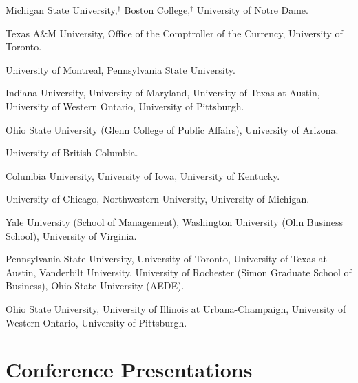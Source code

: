 \documentclass[10pt,letterpaper]{article}
\newcommand{\fncovid}{{\footnotesize ${}^{\dagger}$}}
\begin{document}
\begin{description}[font=\mdseries]
\item[2020]
  Michigan State University,\fncovid
  Boston College,\fncovid
  University of Notre Dame.
\item[2019]
  Texas A\&M University,
  Office of the Comptroller of the Currency,
  University of Toronto.
\item[2018]
  University of Montreal,
  Pennsylvania State University.
\item[2017]
  Indiana University,
  University of Maryland,
  University of Texas at Austin,
  University of Western Ontario,
  University of Pittsburgh.
\item[2016]
  Ohio State University (Glenn College of Public Affairs),
  University of Arizona.
\item[2015]
  University of British Columbia.
\item[2014]
  Columbia University,
  University of Iowa,
  University of Kentucky.
\item[2013]
  University of Chicago,
  Northwestern University,
  University of Michigan.
\item[2012]
  Yale University (School of Management),
  Washington University (Olin Business School),
  University of Virginia.
\item[2011]
  Pennsylvania State University,
  University of Toronto,
  University of Texas at Austin,
  Vanderbilt University,
  University of Rochester (Simon Graduate School of Business),
  Ohio State University (AEDE).
\item[2010]
  Ohio State University,
  University of Illinois at Urbana-Champaign,
  University of Western Ontario,
  University of Pittsburgh.
\end{description}

\section*{Conference Presentations}
\end{document}
